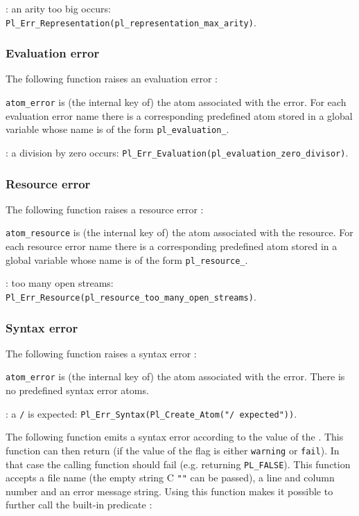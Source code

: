 : an arity too big occurs:
\texttt{Pl\_Err\_Representation(pl\_representation\_max\_arity)}.

\subsubsection{Evaluation error}
The following function raises an evaluation error :


\texttt{atom\_error} is (the internal key of) the atom associated with the
error. For each evaluation error name  there is a
corresponding predefined atom stored in a global variable whose name is of
the form \texttt{pl\_evaluation\_}.

: a division by zero occurs:
\texttt{Pl\_Err\_Evaluation(pl\_evaluation\_zero\_divisor)}.

\subsubsection{Resource error}
The following function raises a resource error :


\texttt{atom\_resource} is (the internal key of) the atom associated with the
resource. For each resource error name  there is a
corresponding predefined atom stored in a global variable whose name is of
the form \texttt{pl\_resource\_}.

: too many open streams:
\texttt{Pl\_Err\_Resource(pl\_resource\_too\_many\_open\_streams)}.

\subsubsection{Syntax error}
The following function raises a syntax error :


\texttt{atom\_error} is (the internal key of) the atom associated with the
error. There is no predefined syntax error atoms.

: a \texttt{/} is expected:
\texttt{Pl\_Err\_Syntax(Pl\_Create\_Atom("/ expected"))}.

The following function emits a syntax error according to the value of the
  . This
function can then return (if the value of the flag is either
\texttt{warning} or \texttt{fail}). In that case the calling function should
fail (e.g. returning \texttt{PL\_FALSE}). This function accepts a file name (the
empty string C \texttt{""} can be passed), a line and column number and an
error message string. Using this function makes it possible to further call
the built-in predicate 
:

